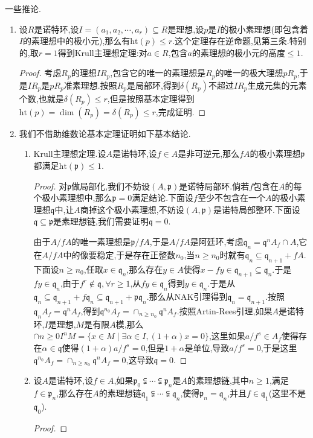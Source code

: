 一些推论.
\begin{enumerate}
	\item 设$R$是诺特环,设$I=(a_1,a_2,\cdots,a_r)\subseteq R$是理想,设$p$是$I$的极小素理想(即包含着$I$的素理想中的极小元),那么有$\mathrm{ht}(p)\le r$.这个定理存在逆命题,见第三条.特别的,取$r=1$得到Krull主理想定理:对$a\in R$,包含$a$的素理想的极小元的高度$\le1$.
	\begin{proof}
		
		考虑$R_p$的理想$IR_p$,包含它的唯一的素理想是$R_p$的唯一的极大理想$pR_p$,于是$IR_p$是$pR_p$准素理想.按照$R_p$是局部环,得到$\delta(R_p)$不超过$IR_p$生成元集的元素个数,也就是$\delta(R_p)\le r$,但是按照基本定理得到$\mathrm{ht}(p)=\dim(R_p)=\delta(R_p)\le r$,完成证明.
	\end{proof}
	\item 我们不借助维数论基本定理证明如下基本结论.
	\begin{enumerate}
		\item Krull主理想定理.设$A$是诺特环,设$f\in A$是非可逆元,那么$fA$的极小素理想$\mathfrak{p}$都满足$\mathrm{ht}(\mathfrak{p})\le1$.
		\begin{proof}
			
			对$\mathfrak{p}$做局部化,我们不妨设$(A,\mathfrak{p})$是诺特局部环.倘若$f$包含在$A$的每个极小素理想中,那么$\mathrm{\mathfrak{p}}=0$满足结论.下面设$f$至少不包含在一个$A$的极小素理想$\mathfrak{q}$中,让$A$商掉这个极小素理想,不妨设$(A,\mathfrak{p})$是诺特局部整环.下面设$\mathfrak{q}\subseteq\mathfrak{p}$是素理想链,我们需要证明$\mathfrak{q}=0$.
			
			\qquad
			
			由于$A/fA$的唯一素理想是$\mathfrak{p}/fA$,于是$A/fA$是阿廷环,考虑$\mathfrak{q}_n=\mathfrak{q}^nA_f\cap A$,它在$A/fA$中的像要稳定,于是存在正整数$n_0$,当$n\ge n_0$时就有$\mathfrak{q}_n\subseteq\mathfrak{q}_{n+1}+fA$.下面设$n\ge n_0$,任取$x\in\mathfrak{q}_n$,那么存在$y\in A$使得$x-fy\in\mathfrak{q}_{n+1}\subseteq\mathfrak{q}_n$.于是$fy\in\mathfrak{q}_n$,由于$f^r\not\in\mathfrak{q},\forall r\ge1$,从$fy\in\mathfrak{q}_n$得到$y\in\mathfrak{q}_n$.于是从$\mathfrak{q}_n\subseteq\mathfrak{q}_{n+1}+f\mathfrak{q}_n\subseteq\mathfrak{q}_{n+1}+\mathfrak{p}\mathfrak{q}_n$.那么从NAK引理得到$\mathfrak{q}_n=\mathfrak{q}_{n+1}$.按照$\mathfrak{q}_nA_f=\mathfrak{q}^nA_f$,得到$\mathfrak{q}^{n_0}A_f=\cap_{n\ge n_0}\mathfrak{q}^nA_f$.按照Artin-Rees引理,如果$A$是诺特环,$I$是理想,$M$是有限$A$模,那么$\cap{n\ge0}I^nM=\{x\in M\mid\exists\alpha\in I,(1+\alpha)x=0\}$,这里如果$a/f^s\in A_f$使得存在$\alpha\in\mathfrak{q}$使得$(1+\alpha)a/f^s=0$,但是$1+\alpha$是单位,导致$a/f^s=0$,于是这里$\mathfrak{q}^{n_0}A_f=\cap_{n\ge n_0}\mathfrak{q}^nA_f=0$,这导致$\mathfrak{q}=0$.
		\end{proof}
	    \item 设$A$是诺特环,设$f\in A$,如果$\mathfrak{p}_0\subsetneqq\cdots\subsetneqq\mathfrak{p}_n$是$A$的素理想链,其中$n\ge1$,满足$f\in\mathfrak{p}_n$,那么存在$A$的素理想链$\mathfrak{q}_1\subsetneqq\cdots\subsetneqq\mathfrak{q}_n$,使得$\mathfrak{p}_n=\mathfrak{q}_n$,并且$f\in\mathfrak{q}_1$(这里不是$\mathfrak{q}_0$).
	    \begin{proof}
	    	

\end{proof}
\end{enumerate}
\end{enumerate}
